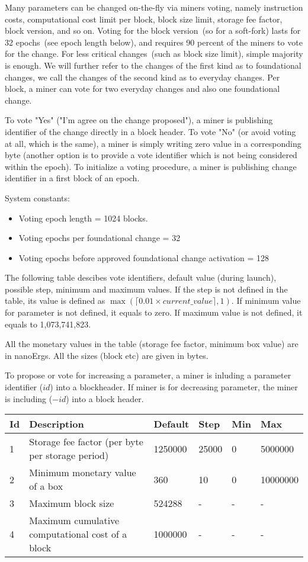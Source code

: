 Many parameters can be changed on-the-fly via miners voting, namely instruction costs, computational cost limit per block,
block size limit, storage fee factor, block version, and so on. Voting for the block version~(so for a soft-fork)
lasts for 32 epochs~(see epoch length below), and requires 90 percent of the miners to vote for the change.
For less critical changes~(such as block size limit), simple majority is enough. We will further refer to the changes
of the first kind as to foundational changes, we call the changes of the second kind as to everyday changes.
Per block, a miner can vote for two everyday changes and also one foundational change.

To vote "Yes" ("I'm agree on the change proposed"), a miner is publishing identifier of the change directly in a
block header. To vote "No" (or avoid voting at all, which is the same), a miner is simply writing zero value in
a corresponding byte (another option is to provide a vote identifier which is not being considered within the epoch).
To initialize a voting procedure, a miner is publishing change identifier in a first block of an epoch.


System constants:
\begin{itemize}
\item{} Voting epoch length = 1024 blocks.
\item{} Voting epochs per foundational change = 32
\item{} Voting epochs before approved foundational change activation = 128
\end{itemize}

The following table descibes vote identifiers, default value (during launch), possible step, minimum and maximum values.
If the step is not defined in the table, its value is defined as $\max(\lceil0.01 \times current\_value\rceil, 1)$.
If minimum value for parameter is not defined, it equals to zero. If maximum value is not defined, it equals to
1,073,741,823.

All the monetary values in the table (storage fee factor, minimum box value) are in nanoErgs. All the sizes (block etc)
are given in bytes.

To propose or vote for increasing a parameter, a miner is inluding a parameter identifier ($id$) into a blockheader.
If miner is for decreasing parameter, the miner is including ($-id$) into a block header.

\begin{tabular}{*{6}{l}}
Id & Description & Default & Step & Min & Max \\
\hline
1 & Storage fee factor (per byte per storage period) & 1250000 & 25000 & 0 & 5000000 \\
2 & Minimum monetary value of a box & 360 & 10 & 0 & 10000000 \\
3 & Maximum block size & 524288 & - & - & - \\
4 & Maximum cumulative computational cost of a block & 1000000 & - & - & - \\
\end{tabular}



